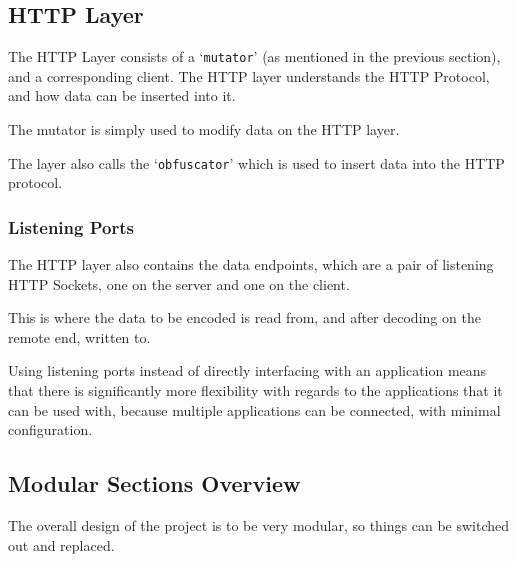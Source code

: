 \subsection{HTTP Layer}
The HTTP Layer consists of a `\texttt{mutator}' (as mentioned in the previous section), and a corresponding client. The HTTP layer understands the HTTP Protocol, and how data can be inserted into it.\par
The mutator is simply used to modify data on the HTTP layer.\par
The layer also calls the `\texttt{obfuscator}' which is used to insert data into the HTTP protocol.

\subsubsection{Listening Ports}
The HTTP layer also contains the data endpoints, which are a pair of listening HTTP Sockets, one on the server and one on the client.\par
This is where the data to be encoded is read from, and after decoding on the remote end, written to.
\begin{center}
\end{center}
Using listening ports instead of directly interfacing with an application means that there is significantly more flexibility with regards to the applications that it can be used with, because multiple applications can be connected, with minimal configuration.

\subsection{Modular Sections Overview}
The overall design of the project is to be very modular, so things can be switched out and replaced.

